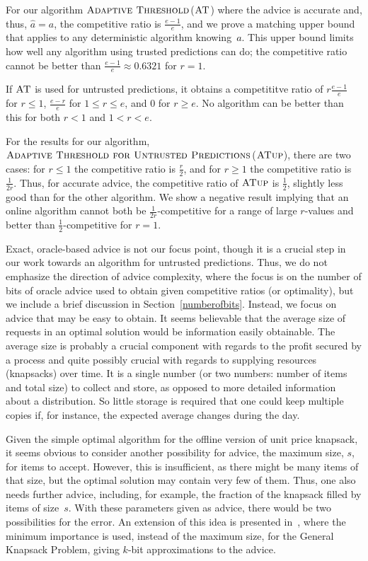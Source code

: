 \documentclass[a4paper,UKenglish,cleveref, autoref, thm-restate]{lipics-v2021}
\newcommand{\bALG}{\ensuremath{\operatorname{\textsc{Adaptive Threshold}}}\xspace}
\newcommand{\ubALG}{\ensuremath{\operatorname{\textsc{Adaptive Threshold for Untrusted Predictions}}}\xspace}
\newcommand{\ADB}{\ensuremath{\operatorname{\textsc{AT}}}\xspace}
\newcommand{\MLB}{\ensuremath{\operatorname{\textsc{ATup}}}\xspace}
\newcommand{\guess}{\ensuremath{\hat{a}}\xspace}
\begin{document}
For our
algorithm \bALG (\ADB) where the advice is accurate and, thus, $\guess=a$, the
competitive ratio is $\frac{e-1}{e}$, and we prove a matching upper
bound that applies to any deterministic algorithm knowing~$a$. This
upper bound limits how well any algorithm using trusted predictions
can do; the competitive ratio cannot be better
than $\frac{e-1}{e} \approx 0.6321$ for $r=1$.

If \ADB is used for untrusted predictions, it obtains a competititve
ratio of $r\frac{e-1}{e}$ for $r \leq 1$, $\frac{e-r}{e}$ for $1 \leq
r \leq e$, and $0$ for $r \geq e$.
No algorithm can be better than this for both $r<1$ and $1 < r < e$.

For the results for
our algorithm, \ubALG (\MLB),
there
are two cases: for
$r\leq 1$ the competitive ratio is $\frac{r}{2}$, and for $r\geq 1$
the competitive ratio is $\frac{1}{2r}$.
Thus, for accurate
advice, the competitive ratio of \MLB is $\frac{1}{2}$, slightly less
good than for the other algorithm.
We show a negative result implying that an online algorithm
cannot both be $\frac{1}{2r}$-competitive for a range of large
$r$-values and better than $\frac12$-competitive for $r=1$.

Exact, oracle-based advice is not our focus point, though it is a
crucial step in our work towards an algorithm for untrusted
predictions. Thus, we do not emphasize the direction of advice
complexity, where the focus is on the number of bits of oracle advice
used to obtain given competitive ratios (or optimality),
but we include a brief discussion in Section~\ref{numberofbits}.
Instead, we
focus on advice that may be easy to obtain.  It seems believable
that the average size of requests in an optimal solution would be information easily
obtainable. The average size is probably a crucial component with
regards to the profit secured by a process and quite possibly crucial
with regards to supplying resources (knapsacks) over time. It is a
single number (or two numbers: number of items and total size) to
collect and store, as opposed to more detailed information about a
distribution. So little storage is required that one could keep
multiple copies if, for instance, the expected average changes during
the day.

Given the simple optimal algorithm for the offline version of unit
price knapsack, it seems obvious to consider another possibility for
advice, the maximum size, $s$, for items to accept. However, this is
insufficient, as there might be many items of that size, but the
optimal solution may contain very few of them. Thus, one also needs
further advice, including, for example, the fraction of the
knapsack filled by items of size~$s$. With these parameters given as advice,
there would be two possibilities for the error.
An extension of this idea is presented
in~\cite{BKKR14}, where the minimum importance is used, instead of the
maximum size, for the General Knapsack Problem, giving $k$-bit
approximations to the advice.
\end{document}
